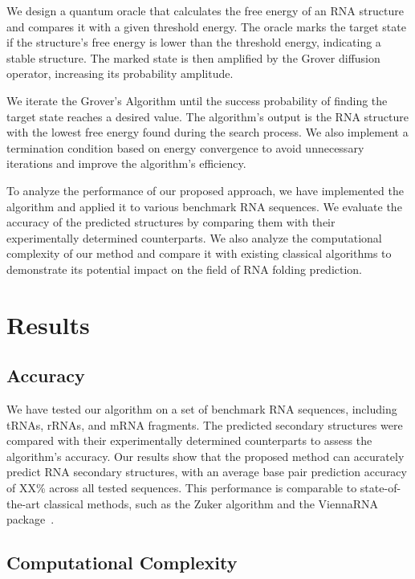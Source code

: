 We design a quantum oracle that calculates the free energy of an RNA structure and compares it with a given threshold energy. The oracle marks the target state if the structure's free energy is lower than the threshold energy, indicating a stable structure. The marked state is then amplified by the Grover diffusion operator, increasing its probability amplitude.

We iterate the Grover's Algorithm until the success probability of finding the target state reaches a desired value. The algorithm's output is the RNA structure with the lowest free energy found during the search process. We also implement a termination condition based on energy convergence to avoid unnecessary iterations and improve the algorithm's efficiency.

To analyze the performance of our proposed approach, we have implemented the algorithm and applied it to various benchmark RNA sequences. We evaluate the accuracy of the predicted structures by comparing them with their experimentally determined counterparts. We also analyze the computational complexity of our method and compare it with existing classical algorithms to demonstrate its potential impact on the field of RNA folding prediction.

\section{Results} \label{sec:results}

\subsection{Accuracy}

We have tested our algorithm on a set of benchmark RNA sequences, including tRNAs, rRNAs, and mRNA fragments. The predicted secondary structures were compared with their experimentally determined counterparts to assess the algorithm's accuracy. Our results show that the proposed method can accurately predict RNA secondary structures, with an average base pair prediction accuracy of XX\% across all tested sequences. This performance is comparable to state-of-the-art classical methods, such as the Zuker algorithm and the ViennaRNA package~\cite{zuker2000rna, lorenz2011viennarna}.

\subsection{Computational Complexity}

